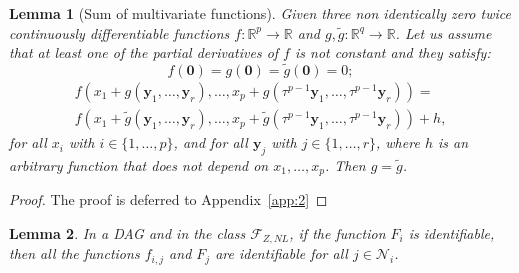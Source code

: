 \documentclass[letterpaper,10pt,journal]{IEEEtran}
\newcommand{\Ftwo}{\mathcal{F}_{Z,NL}}
\newcommand{\y}{\mathbf{y}}
\newtheorem{lemma}{Lemma}
\newcommand{\R}{\mathbb R}
\newcommand{\NN}{\mathcal{N}}
\newcommand{\zero}{\mathbf{0}}
\begin{document}
\begin{lemma}[Sum of multivariate functions]\label{lemma:multivariate_sum}
Given three non identically zero twice continuously differentiable functions $f:\R^p\to \R$ and $g,\tilde g:\R^q\to\R$. Let us assume that at least one of the partial derivatives of $f$ is not constant and they satisfy:
$$
f(\zero)= g(\zero)= \tilde g(\zero)=0;
$$
\vspace{-7mm}
\begin{multline}\label{eq:statement_lemma_function_h}
f(x_1\!+\!g(\y_1,\ldots,\y_r),\ldots,x_p\!+\!g(\tau^{p-1}\y_1,\ldots,\tau^{p-1}\y_r))=\\     
f(x_1\!+\!\tilde g(\y_1,\ldots,\y_r),\ldots,x_p\!+\!\tilde g(\tau^{p-1}\y_1,\ldots,\tau^{p-1}\y_r))+h,
\end{multline}
for all $x_i$ with $i\in \{1,\ldots,p\}$, and for all $\y_j$ with $j\in \{1,\ldots,r\}$, where $h$ is an arbitrary function that does not depend on $x_1,\ldots,x_p$.
Then $g=\tilde g$.
\end{lemma}
\begin{proof}
    The proof is deferred to Appendix~\ref{app:2}
\end{proof}
\begin{lemma}\label{lemma:recursively}
 In a DAG and in the class $\Ftwo$, if the function $F_i$ is identifiable, then all the functions $f_{i,j}$ and 
$F_j$ are identifiable for all $j\in \NN_i$.
\end{lemma}
\end{document}
